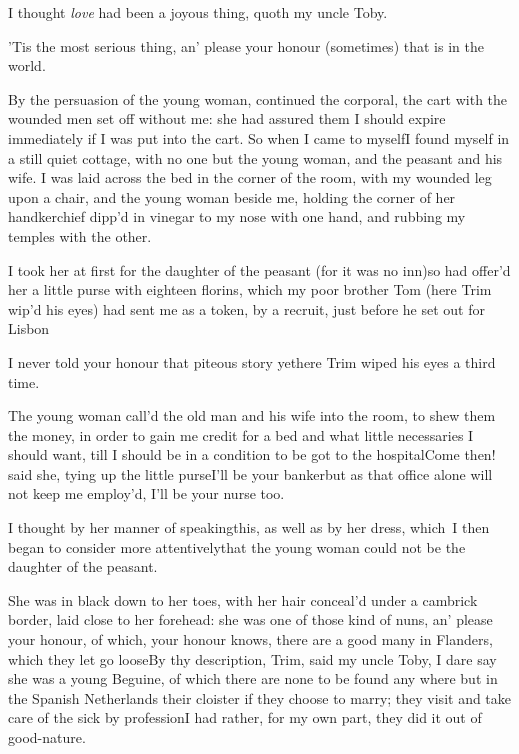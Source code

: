 \documentclass{article}
\begin{document}
I thought \textit{love} had been a joyous thing, quoth my uncle
Toby.

’Tis the most serious thing, an’ please your honour
(sometimes) that is in the world.

By the persuasion of the young woman, continued the corporal,
the cart with the wounded men set off without me: she had assured
them I should expire immediately if I was put into the cart. So
when I came to myself\tsh I found myself in a still quiet
cottage, with no one but the young woman, and the peasant and his
wife. I was laid across the bed in the corner of the room, with my
wounded leg upon a chair, and the young woman beside me, holding
the corner of her handkerchief dipp’d in vinegar to my nose
with one hand, and rubbing my temples with the other.

I took her at first for the daughter of the peasant (for it was
no inn)\tsk so had offer’d her a little purse with eighteen
florins, which my poor brother Tom (here Trim
wip’d his eyes) had sent me as a token, by a recruit, just before he set out for
Lisbon\tsh

\tsh I never told your honour that piteous story
yet\tsh here Trim wiped his eyes a third time.

The young woman call’d the old man and his wife into the
room, to shew them the money, in order to gain me credit for a bed
and what little necessaries I should want, till I should be in a
condition to be got to the hospital\tsh Come then! said
she, tying up the little purse\tsk I’ll be your
banker\tsk but as that office alone will not keep me
employ’d, I’ll be your nurse too.

I thought by her manner of speaking\break this, as well as by her
dress, which~I then began to consider more
attentively\tsh that the young woman could not be the
daughter of the peasant.

She was in black down to her toes, with her hair conceal’d
under a cambrick border, laid close to her forehead: she was one of
those kind of nuns, an’ please your honour, of which, your
honour knows, there are a good many in Flanders,
which they let go loose\tsh By thy description,
Trim, said my uncle Toby, I dare say she was a young
Beguine, of which there are none to be found any where but
in the Spanish Netherlands\tsk\break
{}
their cloister if they choose to marry; they visit
and take care of the sick by profession\tsh I had rather,
for my own part, they did it out of good-nature.
\end{document}
